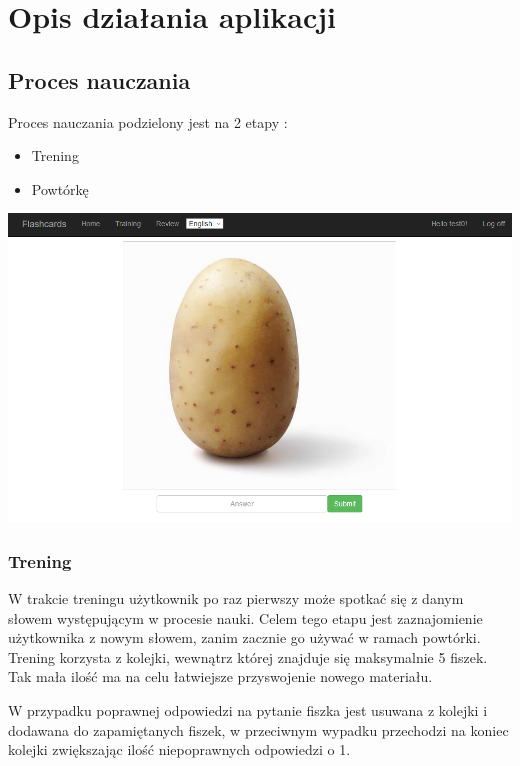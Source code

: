 \newpage
{\let\cleardoublepage\relax \chapter{Opis działania aplikacji}}
\label{cha:main}



\section{Proces nauczania}
Proces nauczania podzielony jest na 2 etapy :
\begin{itemize}
	\item Trening
	\item Powtórkę
\end{itemize}


\begin{center}
	\includegraphics[width=\textwidth]{images/question.png}
\end{center}

\subsection{Trening}

W trakcie treningu użytkownik po raz pierwszy może spotkać się z danym słowem występującym w procesie nauki. Celem tego etapu jest zaznajomienie użytkownika z nowym słowem, zanim zacznie go używać w ramach powtórki.
Trening korzysta z kolejki, wewnątrz której znajduje się maksymalnie 5 fiszek. Tak mała ilość ma na celu łatwiejsze przyswojenie nowego materiału.

W przypadku poprawnej odpowiedzi na pytanie fiszka jest usuwana z kolejki i dodawana do zapamiętanych fiszek, w przeciwnym wypadku przechodzi na koniec kolejki zwiększając ilość niepoprawnych odpowiedzi o 1.

